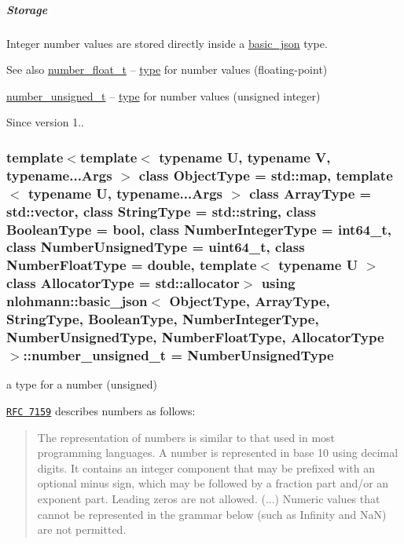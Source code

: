 \subparagraph*{Storage}

Integer number values are stored directly inside a \hyperlink{a00025}{basic\+\_\+json} type.

\begin{DoxySeeAlso}{See also}
\hyperlink{a00025_a74a0013e847fdc574b48f931f0e757e1}{number\+\_\+float\+\_\+t} -- \hyperlink{a00025_a848cbae3bd3502ffbf738320bf5eb3aa}{type} for number values (floating-\/point)

\hyperlink{a00025_a60a04166c122072ab11eaf9845d9cd1d}{number\+\_\+unsigned\+\_\+t} -- \hyperlink{a00025_a848cbae3bd3502ffbf738320bf5eb3aa}{type} for number values (unsigned integer)
\end{DoxySeeAlso}
\begin{DoxySince}{Since}
version 1.. 
\end{DoxySince}
\subsubsection[{\texorpdfstring{number\+\_\+unsigned\+\_\+t}{number\_unsigned\_t}}]{\setlength{\rightskip}{0pt plus 5cm}template$<$template$<$ typename U, typename V, typename...\+Args $>$ class Object\+Type = std\+::map, template$<$ typename U, typename...\+Args $>$ class Array\+Type = std\+::vector, class String\+Type  = std\+::string, class Boolean\+Type  = bool, class Number\+Integer\+Type  = int64\+\_\+t, class Number\+Unsigned\+Type  = uint64\+\_\+t, class Number\+Float\+Type  = double, template$<$ typename U $>$ class Allocator\+Type = std\+::allocator$>$ using {\bf nlohmann\+::basic\+\_\+json}$<$ Object\+Type, Array\+Type, String\+Type, Boolean\+Type, Number\+Integer\+Type, Number\+Unsigned\+Type, Number\+Float\+Type, Allocator\+Type $>$\+::{\bf number\+\_\+unsigned\+\_\+t} =  Number\+Unsigned\+Type}\hypertarget{a00025_a60a04166c122072ab11eaf9845d9cd1d}{}\label{a00025_a60a04166c122072ab11eaf9845d9cd1d}


a type for a number (unsigned) 

\href{http://rfc7159.net/rfc7159}{\tt R\+FC 7159} describes numbers as follows\+: \begin{quote}
The representation of numbers is similar to that used in most programming languages. A number is represented in base 10 using decimal digits. It contains an integer component that may be prefixed with an optional minus sign, which may be followed by a fraction part and/or an exponent part. Leading zeros are not allowed. (...) Numeric values that cannot be represented in the grammar below (such as Infinity and NaN) are not permitted. \end{quote}


